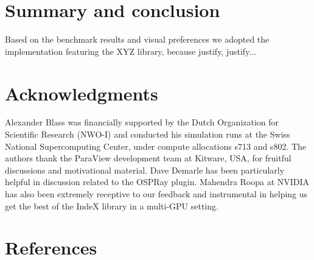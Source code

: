 \documentclass[final,5p,times,twocolumn]{elsarticle}
\begin{document}
\section{Summary and conclusion}

Based on the benchmark results and visual preferences we adopted the implementation
featuring the XYZ library, because justify, justify...



\section*{Acknowledgments}

Alexander Blass was financially supported by the Dutch Organization for Scientific Research (NWO-I) and conducted his simulation runs at the Swiss National Supercomputing Center, under compute allocations s713 and s802. The authors thank the ParaView development team at Kitware, USA, for fruitful discussions and motivational material. Dave Demarle has been particularly helpful in discussion related to the OSPRay plugin. Mahendra Roopa ‎at NVIDIA has also been extremely receptive to our feedback and instrumental in helping us get the best of the IndeX library in a multi-GPU setting.

\section*{References}
 

\end{document}
